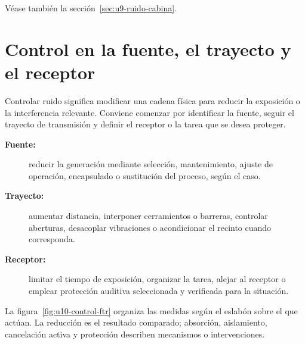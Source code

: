 
 Véase también la
sección~\ref{sec:u9-ruido-cabina}.

\section{Control en la fuente, el trayecto y el receptor}
\label{sec:u10-control}

Controlar ruido significa modificar una cadena física para reducir la
exposición o la interferencia relevante. Conviene comenzar por identificar la
fuente, seguir el trayecto de transmisión y definir el receptor o la tarea que
se desea proteger.

\begin{description}
    \item[\textbf{Fuente:}] reducir la generación mediante selección,
    mantenimiento, ajuste de operación, encapsulado o sustitución del proceso,
    según el caso.
    \item[\textbf{Trayecto:}] aumentar distancia, interponer cerramientos o
    barreras, controlar aberturas, desacoplar vibraciones o acondicionar el
    recinto cuando corresponda.
    \item[\textbf{Receptor:}] limitar el tiempo de exposición, organizar la
    tarea, alejar al receptor o emplear protección auditiva seleccionada y
    verificada para la situación.
\end{description}


La figura~\ref{fig:u10-control-ftr} organiza las medidas según el eslabón sobre
el que actúan. La reducción es el resultado comparado; absorción, aislamiento,
cancelación activa y protección describen mecanismos o intervenciones.

